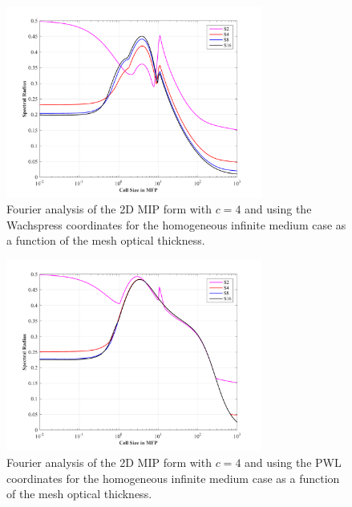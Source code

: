 \begin{figure}
\centering
\includegraphics[width=0.75\textwidth]{figures/sec_DSA/SI_MIP_quad_C=4_Wachspress1_LS2,4,8,16.png}
\caption{Fourier analysis of the 2D MIP form with $c=4$ and using the Wachspress coordinates for the homogeneous infinite medium case as a function of the mesh optical thickness.}
\label{fig::DSA_1G_Fourier_Wach1}
\end{figure}

\begin{figure}
\centering
\includegraphics[width=0.75\textwidth]{figures/sec_DSA/SI_MIP_quad_C=4_PWLD1_LS2,4,8,16.png}
\caption{Fourier analysis of the 2D MIP form with $c=4$ and using the PWL coordinates for the homogeneous infinite medium case as a function of the mesh optical thickness.}
\label{fig::DSA_1G_Fourier_PWL1}
\end{figure}

